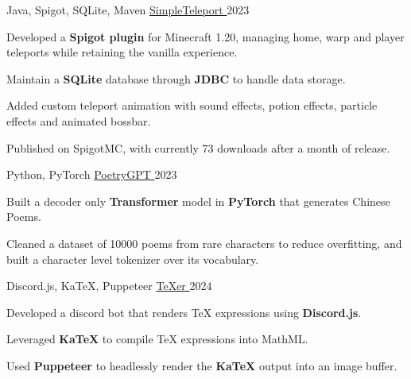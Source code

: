 

\begin{cventries}

  \cventry
    {Java, Spigot, SQLite, Maven} %
    {\href{https://github.com/shiqui/simple-teleport}{SimpleTeleport {\faLink}}} %
    {} %
    {2023} %
    {
      \begin{cvitems} %
        \item {Developed a \textbf{Spigot plugin} for Minecraft 1.20, managing home, warp and player teleports while retaining the vanilla experience.}
        \item {Maintain a \textbf{SQLite} database through \textbf{JDBC} to handle data storage.}
        \item {Added custom teleport animation with sound effects, potion effects, particle effects and animated bossbar.}
        \item {Published on SpigotMC, with currently 73 downloads after a month of release.}
      \end{cvitems}
    }

  \cventry
  {Python, PyTorch} %
  {\href{https://github.com/shiqui/PoetryGPT}{PoetryGPT {\faLink}}} %
  {} %
  {2023} %
  {
    \begin{cvitems} %
      \item {Built a decoder only \textbf{Transformer} model in \textbf{PyTorch} that generates Chinese Poems.}
      \item {Cleaned a dataset of 10000 poems from rare characters to reduce overfitting, and built a character level tokenizer over its vocabulary.}
    \end{cvitems}
  }

  \cventry
  {Discord.js, KaTeX, Puppeteer} %
  {\href{https://github.com/shiqui/TeXer}{TeXer {\faLink}}} %
  {} %
  {2024} %
  {
    \begin{cvitems} %
      \item {Developed a discord bot that renders TeX expressions using \textbf{Discord.js}.}
      \item {Leveraged \textbf{KaTeX} to compile TeX expressions into MathML.}
      \item {Used \textbf{Puppeteer} to headlessly render the \textbf{KaTeX} output into an image buffer.}
    \end{cvitems}
  }
  

\end{cventries}
